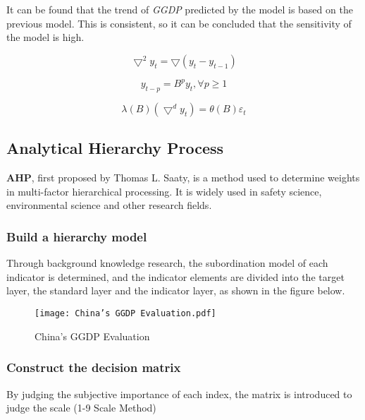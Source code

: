 \documentclass[12pt]{article}
\begin{document}
	It can be found that the trend of \textit{GGDP} predicted by the model is based on the previous model. This is consistent, so it can be concluded that the sensitivity of the model is high.
	
	\begin{equation}\label{eq:cha fen}
		\bigtriangledown^{2}y_{t}=\bigtriangledown(y_{t}-y_{t-1})
	\end{equation}

	\begin{equation}\label{eq:yan chi suan zi}
		y_{t-p}=B^{p}y_{t},\forall p\ge 1
	\end{equation}

	\begin{equation}\label{eq:ARMA pq}
		\lambda (B)(\bigtriangledown ^{d}y_{t})=\theta (B)\varepsilon _{t}
	\end{equation}
	
	\subsection{Analytical Hierarchy Process}\label{AHP}
	\textbf{AHP}, first proposed by Thomas L. Saaty, is a method used to determine weights in multi-factor hierarchical processing.
	It is widely used in safety science, environmental science and other research fields\cite{9}.
	
	\subsubsection{Build a hierarchy model}
	Through background knowledge research, the subordination model of each indicator is determined, and the indicator elements are divided into the target layer, the standard layer and the indicator layer, as shown in the figure below.
	
	\begin{figure}[!htbp]
		\centering
		\texttt{[image: China's GGDP Evaluation.pdf]}
		\caption{China's GGDP Evaluation}\label{}
	\end{figure}

	\subsubsection{Construct the decision matrix}
	By judging the subjective importance of each index, the matrix is introduced to judge the scale (1-9 Scale Method)
	
\end{document}
